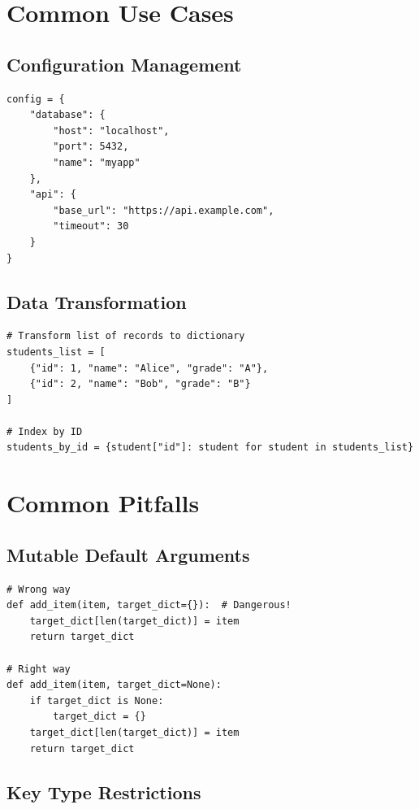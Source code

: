 \documentclass[12pt,a4paper]{article}
\begin{document}
\section{Common Use Cases}

\subsection{Configuration Management}

\begin{lstlisting}
config = {
    "database": {
        "host": "localhost",
        "port": 5432,
        "name": "myapp"
    },
    "api": {
        "base_url": "https://api.example.com",
        "timeout": 30
    }
}
\end{lstlisting}

\subsection{Data Transformation}

\begin{lstlisting}
# Transform list of records to dictionary
students_list = [
    {"id": 1, "name": "Alice", "grade": "A"},
    {"id": 2, "name": "Bob", "grade": "B"}
]

# Index by ID
students_by_id = {student["id"]: student for student in students_list}
\end{lstlisting}

\section{Common Pitfalls}

\subsection{Mutable Default Arguments}

\begin{lstlisting}
# Wrong way
def add_item(item, target_dict={}):  # Dangerous!
    target_dict[len(target_dict)] = item
    return target_dict

# Right way
def add_item(item, target_dict=None):
    if target_dict is None:
        target_dict = {}
    target_dict[len(target_dict)] = item
    return target_dict
\end{lstlisting}

\subsection{Key Type Restrictions}
\end{document}
